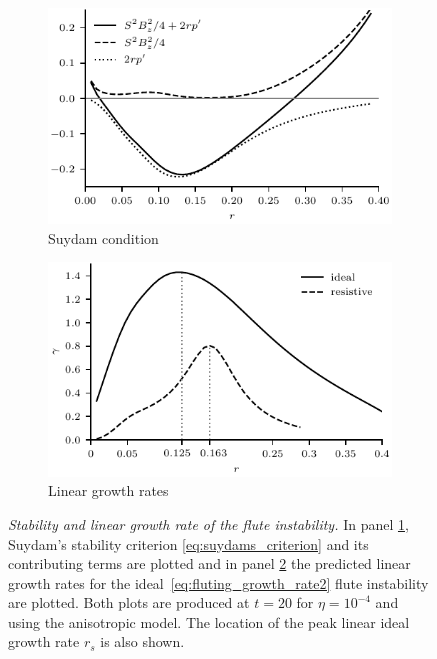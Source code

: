 \documentclass[fleqn,usenatbib]{mnras}
\newcommand{\rev}[1]{{\color{red} {#1}}}
\newcommand{\mycaption}[2]{\caption[#1]{\emph{#1} #2}}
\begin{document}
\begin{figure}
  \centering
    \begin{subfigure}{0.49\textwidth}
      \includegraphics[width=\linewidth]{suydam_condition_4.pdf}
      \caption{Suydam condition}
      \label{fig:suydam_condition_4}
    \end{subfigure}
    \hfill
    \begin{subfigure}{0.49\textwidth}
      \includegraphics[width=\linewidth]{flute_eta-4_stability.pdf}
      \caption{Linear growth rates}
      \label{fig:growth_rate_4}
    \end{subfigure}
\mycaption{Stability and linear growth rate of the flute instability.}{In panel
\ref{fig:suydam_condition_4}, Suydam's stability criterion
\eqref{eq:suydams_criterion} and its contributing terms  are plotted and in
panel \ref{fig:growth_rate_4} the predicted linear growth rates for the
ideal~\eqref{eq:fluting_growth_rate2} flute instability are plotted. Both plots
are produced at $t=20$ for $\eta=10^{-4}$ and using the anisotropic model. The
location of the \rev{peak linear ideal growth rate $r_s$} is also shown.}
\label{fig:stability_and_growth}%
\end{figure}
\end{document}
